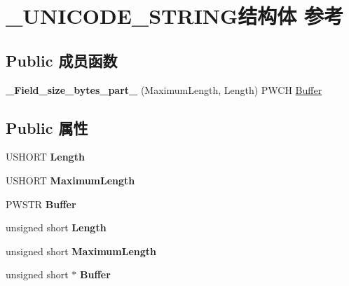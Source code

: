 \hypertarget{struct___u_n_i_c_o_d_e___s_t_r_i_n_g}{}\section{\+\_\+\+U\+N\+I\+C\+O\+D\+E\+\_\+\+S\+T\+R\+I\+N\+G结构体 参考}
\label{struct___u_n_i_c_o_d_e___s_t_r_i_n_g}
\subsection*{Public 成员函数}
\begin{DoxyCompactItemize}
\item 
\mbox{\label{struct___u_n_i_c_o_d_e___s_t_r_i_n_g_a4c332e21eed38f0bab5e82e8e962661d}} 
{\bfseries \+\_\+\+Field\+\_\+size\+\_\+bytes\+\_\+part\+\_\+} (Maximum\+Length, Length) P\+W\+CH \hyperlink{class_buffer}{Buffer}
\end{DoxyCompactItemize}
\subsection*{Public 属性}
\begin{DoxyCompactItemize}
\item 
\mbox{\label{struct___u_n_i_c_o_d_e___s_t_r_i_n_g_a3ebb6a85103954fd7fc325ba30c54008}} 
U\+S\+H\+O\+RT {\bfseries Length}
\item 
\mbox{\label{struct___u_n_i_c_o_d_e___s_t_r_i_n_g_ae0487ecc173e55918bcee834bd3d107b}} 
U\+S\+H\+O\+RT {\bfseries Maximum\+Length}
\item 
\mbox{\label{struct___u_n_i_c_o_d_e___s_t_r_i_n_g_afbc2ba2b7be88d0118e683a2eb289795}} 
P\+W\+S\+TR {\bfseries Buffer}
\item 
\mbox{\label{struct___u_n_i_c_o_d_e___s_t_r_i_n_g_a38ac16128316142a29e38b14d4793f1b}} 
unsigned short {\bfseries Length}
\item 
\mbox{\label{struct___u_n_i_c_o_d_e___s_t_r_i_n_g_a0e3b92b31b237cd56795ee7e2c46b3f5}} 
unsigned short {\bfseries Maximum\+Length}
\item 
\mbox{\label{struct___u_n_i_c_o_d_e___s_t_r_i_n_g_ad2ff966ddb0f181b789e2d6180754712}} 
unsigned short $\ast$ {\bfseries Buffer}
\end{DoxyCompactItemize}


